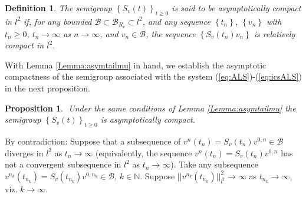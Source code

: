 \documentclass[preprintnumbers,amsmath,amssymb]{revtex4}
\newtheorem{definition}{Definition}[section]
\newtheorem{proposition}{Proposition}[section]
\begin{document}
% 
% 
% 

\begin{definition} 
\label{def:asymcompact}	
The semigroup  $\left\{S_v(t)\right\}_{t\ge 0}$ is said to be asymptotically compact in $l^2$ if, for any bounded $\mathcal{B} \subset \mathcal{B}_{R_v}\subset  l^2$, and any sequence 
$\left\{t_n\right\}$,  $\left\{v_n\right\}$ with $t_n\ge 0$, $t_n \rightarrow \infty$ as $n\rightarrow \infty$, and $v_n \in \mathcal{B}$, the sequence  $\left\{S_v(t_n)v_n\right\} $ is relatively compact in $l^2$.
\end{definition}
With Lemma \ref{Lemma:asymtailmu} in hand, we establish the asymptotic compactness of the semigroup associated with the system (\ref{eq:ALS})-(\ref{eq:icsALS}) in the next proposition.
\begin{proposition}
{\it \,\,Under the same conditions of  Lemma \ref{Lemma:asymtailmu} the semigroup $\left\{S_v(t)\right\}_{t\ge 0}$  is asymptotically compact.}
\label{Proposition:asymcompmu}
\end{proposition}
 By contradiction: Suppose that a subsequence of $v^n(t_n)=S_v(t_n)v^{0,n} \in \mathcal{B}$ diverges in $l^2$ as $t_n \rightarrow \infty$ (equivalently, the sequence $v^n(t_n)=S_v(t_n)v^{0,n}$ has not a convergent subsequence in $l^2$ as $t_n \rightarrow \infty$).
 Take any subsequence  $v^{n_k}(t_{n_k})=S_v(t_{n_k})v^{0,n_k} \in \mathcal{B}$, $k\in {\mathbb{N}}$. Suppose $||  v^{n_k}(t_{n_k}) ||_{l^2}^2 \rightarrow \infty$ as $t_{n_k}\rightarrow \infty$, viz. $k\rightarrow \infty$. 
 
\end{document}

